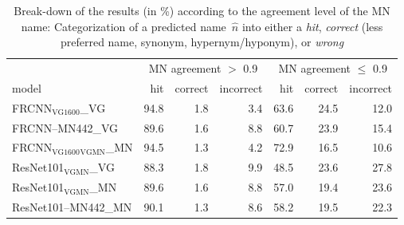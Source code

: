 \begin{table}[t]
\centering
	\small
\begin{tabular}{lrrr||rrr}
\toprule
&  \multicolumn{3}{c||}{MN agreement $>$ 0.9} & \multicolumn{3}{c}{MN agreement $\leq$ 0.9}\\
                  model &  hit &  correct &  incorrect &  hit &  correct &  incorrect \\
\midrule
       FRCNN$_{\text{VG1600}}$\_VG &      94.8 &           1.8 &             3.4 &     63.6 &         24.5 &           12.0 \\
        FRCNN--MN442\_VG &      89.6 &           1.6 &             8.8 &     60.7 &         23.9 &           15.4 \\
        		\midrule \midrule
 FRCNN$_{\text{VG1600}}$$_{\text{VGMN}}$\_MN &      94.5 &           1.3 &             4.2 &     72.9 &         16.5 &           10.6 \\
 		\midrule 
     ResNet101$_{\text{VGMN}}$\_VG &      88.3 &           1.8 &             9.9 &     48.5 &         23.6 &           27.8 \\
     ResNet101$_{\text{VGMN}}$\_MN &      89.6 &           1.6 &             8.8 &     57.0 &         19.4 &           23.6 \\
    ResNet101--MN442\_MN &      90.1 &           1.3 &             8.6 &     58.2 &         19.5 &           22.3 \\
\bottomrule

\end{tabular}
\caption{Break-down of the results (in \%) according to the agreement level of the MN name: Categorization of a predicted name\ $\hat{n}$ into either a \textit{hit}, \textit{correct} (less preferred name, synonym, hypernym/hyponym), or \textit{wrong} \label{tab:exp_errors_agreement}}
\end{table}

